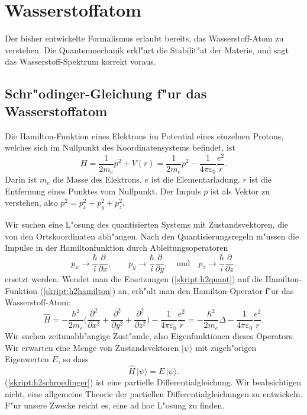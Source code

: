\chapter{Wasserstoffatom\label{chapter:wasserstoff}}
\rhead{}
Der bisher entwickelte Formalismus erlaubt bereits, das Wasserstoff-Atom
zu verstehen. Die Quantenmechanik erkl"art die Stabilit"at der
Materie, und sagt das Wasserstoff-Spektrum korrekt voraus.
\section{Schr"odinger-Gleichung f"ur das Wasserstoffatom}
Die Hamilton-Funktion eines Elektrons im Potential eines einzelnen
Protons, welches sich im Nullpunkt des Koordinatensystems befindet,
ist
\begin{equation}
H=\frac1{2m_e}p^2 + V(r)
=\frac1{2m_e}p^2 - \frac1{4\pi\varepsilon_0}\frac{e^2}{r}.
\label{skript:h2hamilton}
\end{equation}
Darin ist $m_e$ die Masse des Elektrons, $e$ ist die Elementarladung.
$r$ ist die Entfernung eines Punktes vom Nullpunkt.
Der Impuls $p$ ist als Vektor zu verstehen, also $p^2=p_x^2+p_y^2+p_z^2$.

Wir suchen eine L"osung des quantisierten Systems mit Zustandsvektoren, die von
den Ortskoordinaten abh"angen.
Nach den Quantisierungsregeln m"ussen die Impulse in der Hamiltonfunktion
durch Ableitungsoperatoren
\begin{equation}
p_x\rightarrow \frac{\hbar}{i}\frac{\partial}{\partial x},
\qquad
p_y\rightarrow \frac{\hbar}{i}\frac{\partial}{\partial y},
\quad
\text{und}
\quad
p_z\rightarrow \frac{\hbar}{i}\frac{\partial}{\partial z}.
\label{skript:h2quant}
\end{equation}
ersetzt werden. Wendet man die Ersetzungen (\ref{skript:h2quant}) auf die
Hamilton-Funktion (\ref{skript:h2hamilton}) an, erh"alt man den Hamilton-Operator
f"ur das Wasserstoff-Atom:
\[
\hat H=-\frac{\hbar^2}{2m_e}\biggl(
\frac{\partial^2}{\partial x^2}+
\frac{\partial^2}{\partial y^2}+
\frac{\partial^2}{\partial z^2}
\biggr)-\frac1{4\pi\varepsilon_0}\frac{e^2}{r}
=-\frac{\hbar^2}{2m_e}\Delta -\frac1{4\pi\varepsilon_0}\frac{e^2}{r}.
\]
Wir suchen zeitunabh"angige Zust"ande, also Eigenfunktionen dieses
Operators. Wir erwarten eine Menge von Zustandsvektoren $|\psi\rangle$
mit zugeh"origen Eigenwerten $E$, so dass
\begin{equation}
\hat H\,|\psi\rangle = E\,|\psi\rangle.
\label{skript:h2schroedinger}
\end{equation}
(\ref{skript:h2schroedinger}) ist eine partielle Differentialgleichung.
Wir beabsichtigen nicht, eine allgemeine Theorie der partiellen
Differentialgleichungen zu entwickeln.
F"ur unsere Zwecke reicht es, eine ad hoc L"osung zu finden.

